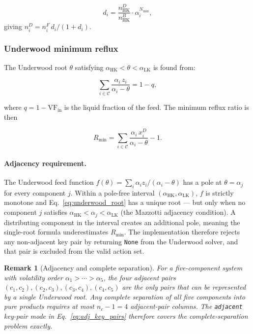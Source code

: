 \documentclass[11pt,a4paper]{article}
\theoremstyle{definition}
\theoremstyle{plain}
\newtheorem{remark}{Remark}[section]
\newcommand{\calC}{\mathcal{C}}
\begin{document}
\begin{equation}
 d_i = \frac{n_{\mathrm{HK}}^D}{n_{\mathrm{HK}}^B}
    \cdot \alpha_i^{N_{\min}},
\end{equation}
giving $n_i^D = n_i^F\, d_i / (1 + d_i)$.

\subsubsection{Underwood minimum reflux}
\label{sec:underwood}

The Underwood root $\theta$ satisfying $\alpha_{\mathrm{HK}} < \theta < \alpha_{\mathrm{LK}}$ is found from:

\begin{equation}
 \sum_{i \in \calC}
 \frac{\alpha_i\, z_i}{\alpha_i - \theta} = 1 - q,
 \label{eq:underwood_root}
\end{equation}

where $q = 1 - \mathrm{VF}_{\mathrm{in}}$ is the liquid fraction of the feed. The minimum reflux ratio is then

\begin{equation}
 R_{\min}
 = \sum_{i \in \calC}
  \frac{\alpha_i\, x_i^D}{\alpha_i - \theta} - 1.
 \label{eq:rmin}
\end{equation}

\paragraph{Adjacency requirement.}
The Underwood feed function $f(\theta) = \sum_i \alpha_i z_i / (\alpha_i - \theta)$ has a pole at $\theta = \alpha_j$ for every component $j$. Within a pole-free interval $(\alpha_{\mathrm{HK}}, \alpha_{\mathrm{LK}})$, $f$ is strictly monotone and Eq.~\eqref{eq:underwood_root} has a unique root — but only when no component $j$ satisfies $\alpha_{\mathrm{HK}} < \alpha_j < \alpha_{\mathrm{LK}}$ (the Mazzotti adjacency condition). A distributing component in the interval creates an additional pole, meaning the single-root formula underestimates $R_{\min}$. The implementation therefore rejects any non-adjacent key pair by returning \texttt{None} from the Underwood solver, and that pair is excluded from the valid action set.

\begin{remark}[Adjacency and complete separation] 
	For a five-component system with volatility order $\alpha_1 > \cdots > \alpha_5$, the four adjacent pairs $(c_1,c_2), (c_2,c_3), (c_3,c_4), (c_4,c_5)$ are the only pairs that can be represented by a single Underwood root. Any complete separation of all five components into pure products requires at most $n_c - 1 = 4$ adjacent-pair columns. The \texttt{adjacent} key-pair mode in Eq.~\eqref{eq:adj_key_pairs} therefore covers the complete-separation problem exactly.
\end{remark}
\end{document}
